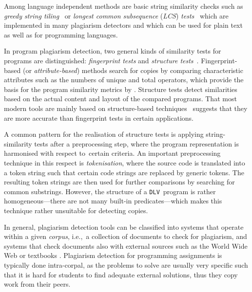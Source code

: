 \documentclass{tlp}
\newcommand{\dlv}{\texttt{DLV}\xspace}
\newcommand{\wrt}[0]{with respect to}
\newcommand{\iec}[0]{i.e.,\ }
\begin{document}
Among language independent methods are basic string similarity checks 
such as \emph{greedy string tiling}~\cite{greedy93} or \emph{longest common subsequence} (\emph{LCS}) \emph{tests}~\cite{bergroth00} which
are implemented in many plagiarism detectors and which can be used for plain text as well as for  programming languages.

In program plagiarism detection, two general kinds of similarity tests for programs are distinguished:
\emph{fingerprint tests} and \emph{structure tests}~\cite{whale90}.
Fingerprint-based (or \emph{attribute-based}) methods search for copies by comparing characteristic attributes
such as the numbers of unique and total operators,
which provide the basis for the program similarity metrics by .
Structure tests detect similarities based on the actual content and layout of the compared programs.
That most modern tools are mainly based on structure-based techniques~\cite{VercoWise96,Mozgovoy08} suggests
that they are  more accurate than fingerprint tests in certain applications.

A common pattern for the realisation of structure tests is applying string-similarity tests after
a preprocessing step, where the program representation is harmonised \wrt\ certain criteria.
An important preprocessing technique in this respect is \emph{tokenisation},
where the source code is translated into a token string such that certain code strings are replaced by generic tokens.
The resulting token strings are then used for further comparisons by searching for common substrings. However, 
the structure of a \dlv\ program is rather homogeneous---there are not many built-in predicates---which makes this technique rather unsuitable for detecting copies.

In general, plagiarism detection tools can be classified into systems that
operate within a given \emph{corpus}, \iec a collection of documents to check for plagiarism,
and systems that check documents also with external sources such as the World Wide Web
or textbooks \cite{lancaster-classifications}.
Plagiarism detection for programming assignments is typically done intra-corpal,
as the problems to solve are usually very specific such that it is hard for 
students to find adequate external solutions, thus they copy work from their peers.
\end{document}
